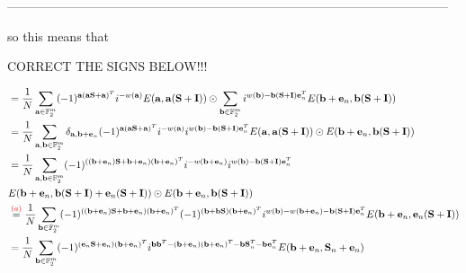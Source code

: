 \documentclass{article}
\begin{document}
	---------------------------------------------------------------------------------------------------------
	
	
	so this means that
	
	CORRECT THE SIGNS BELOW!!!
	
	\begin{align*}
		&=\frac{1}{N} \sum_{\mathbf{a}\in \mathbb{F}_2^m} (-1)^{\mathbf{a}(\mathbf{a}\mathbf{S} + \mathbf{a})^T} i^{-w(\mathbf{a})} E(\mathbf{a}, \mathbf{a}(\mathbf{S} + \mathbf{I})) \odot \sum_{\mathbf{b}\in \mathbb{F}_2^m} i^{w(\mathbf{b}) - \mathbf{b}(\mathbf{S} + \mathbf{I})\mathbf{e}_n^T} E(\mathbf{b} + \mathbf{e}_n, \mathbf{b}(\mathbf{S} + \mathbf{I})) \\
		&=\frac{1}{N}\sum_{\mathbf{a},\mathbf{b}\in \mathbb{F}_2^m} \delta_{\mathbf{a}, \mathbf{b} + \mathbf{e}_n} (-1)^{\mathbf{a}(\mathbf{a}\mathbf{S} + \mathbf{a})^T} i^{-w(\mathbf{a})} i^{w(\mathbf{b})-\mathbf{b}(\mathbf{S}+\mathbf{I})\mathbf{e}_n^T} E(\mathbf{a}, \mathbf{a}(\mathbf{S}+\mathbf{I})) \odot E(\mathbf{b} + \mathbf{e}_n, \mathbf{b}(\mathbf{S}+\mathbf{I})) \\
		&=\frac{1}{N}\sum_{\mathbf{a},\mathbf{b}\in \mathbb{F}_2^m} (-1)^{((\mathbf{b}+\mathbf{e}_n)\mathbf{S} + \mathbf{b}+\mathbf{e}_n)(\mathbf{b}+\mathbf{e}_n)^T} i^{-w(\mathbf{b}+\mathbf{e}_n)} i^{w(\mathbf{b})-\mathbf{b}(\mathbf{S}+\mathbf{I})\mathbf{e}_n^T} \\
		&E(\mathbf{b}+\mathbf{e}_n, \mathbf{b}(\mathbf{S}+\mathbf{I}) +\mathbf{e}_n (\mathbf{S}+\mathbf{I})) \odot E(\mathbf{b} + \mathbf{e}_n, \mathbf{b}(\mathbf{S}+\mathbf{I})) \\
		&\stackrel{\textcolor{red}{(a)}}{=}\frac{1}{N}\sum_{\mathbf{b}\in \mathbb{F}_2^m}(-1)^{((\mathbf{b}+\mathbf{e}_n)\mathbf{S}+\mathbf{b}+\mathbf{e}_n)(\mathbf{b}+\mathbf{e}_n)^T} (-1)^{(\mathbf{b+bS})(\mathbf{b}+\mathbf{e}_n)^T} i^{w(\mathbf{b})-w(\mathbf{b}+\mathbf{e}_n)-\mathbf{b}(\mathbf{S}+\mathbf{I})\mathbf{e}_n^T}E(\mathbf{b} + \mathbf{e}_n, \mathbf{e}_n(\mathbf{S}+\mathbf{I}))   \\
		&=\frac{1}{N} \sum_{ \mathbf{b}\in \mathbb{F}_2^m }(-1)^{(\mathbf{e}_n\mathbf{S}+\mathbf{e}_n)(\mathbf{b}+\mathbf{e}_n)^T} i^{\mathbf{b}\mathbf{b}^T - (\mathbf{b}+\mathbf{e}_n)(\mathbf{b}+\mathbf{e}_n)^T - \mathbf{b}\mathbf{S}_n^T - \mathbf{b}\mathbf{e}_n^T}E(\mathbf{b}+\mathbf{e}_n, \mathbf{S}_n + \mathbf{e}_n)  \\ 

\end{align*}
\end{document}
